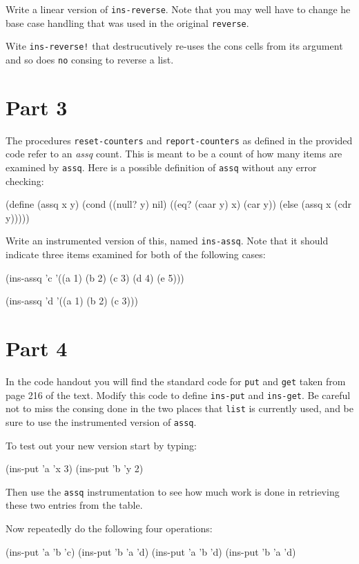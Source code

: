 Write a linear version of {\tt ins-reverse}.
Note that you may well have to change he base case handling that was
used in the original {\tt reverse}.

 Wite {\tt ins-reverse!} that destrucutively
re-uses the cons cells from its argument and so does {\tt no} consing to
reverse a list.

\section{Part 3}

The procedures {\tt reset-counters} and {\tt report-counters} as defined
in the provided code refer to an {\it assq} count.  This is meant to be a
count of how many items are examined by {\tt assq}.  Here is a possible
definition of {\tt assq} without any error checking:

\beginlisp
(define (assq x y)
  (cond ((null? y) nil)
        ((eq? (caar y) x) (car y))
        (else (assq x (cdr y)))))
\endlisp

\noindent Write an instrumented version of this, named {\tt ins-assq}. 
Note that it should indicate three items examined for both of the
following cases:

\beginlisp
(ins-assq 'c '((a 1) (b 2) (c 3) (d 4) (e 5)))

(ins-assq 'd '((a 1) (b 2) (c 3)))
\endlisp

\section{Part 4}

In the code handout you will find the standard code for {\tt put} and
{\tt get} taken from page 216 of the text.  Modify this code to define
{\tt ins-put} and {\tt ins-get}.  Be careful not to miss the consing
done in the two places that {\tt list} is currently used, and be sure to
use the instrumented version of {\tt assq}.

To test out your new version start by typing:

\beginlisp
(ins-put 'a 'x 3)
(ins-put 'b 'y 2)
\endlisp

\noindent Then use the {\tt assq} instrumentation to see how much work
is done in retrieving these two entries from the table.

Now repeatedly do the following four operations:

\beginlisp
(ins-put 'a 'b 'c)
(ins-put 'b 'a 'd)
(ins-put 'a 'b 'd)
(ins-put 'b 'a 'd)
\endlisp

